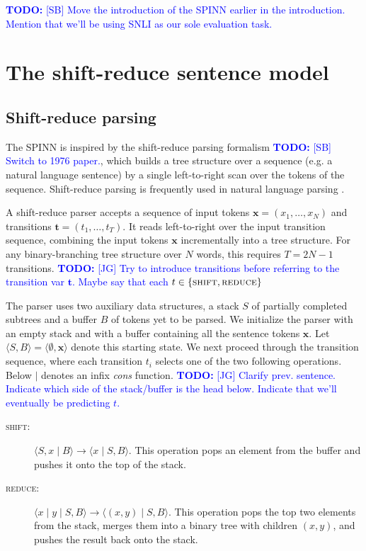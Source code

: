 \documentclass[11pt]{article}
\newcommand\todo[1]{\textcolor{blue}{\textbf{TODO:} #1}}
\newcommand{\shift}{\textsc{shift}}
\newcommand{\reduce}{\textsc{reduce}}
\begin{document}
\todo{[SB] Move the introduction of the SPINN earlier in the introduction. Mention that we'll be using SNLI as our sole evaluation task.}

\section{The shift-reduce sentence model}

\subsection{Shift-reduce parsing}

The SPINN is inspired by the shift-reduce parsing formalism \citep{aho1986compilers} \todo{[SB] Switch to 1976 paper.}, which builds a tree structure over a sequence (e.g. a natural language sentence) by a single left-to-right scan over the tokens of the sequence. Shift-reduce parsing is frequently used in natural language parsing \citep[e.g.][]{nivre2003efficient}.

A shift-reduce parser accepts a sequence of input tokens $\mathbf x = (x_1, \dots, x_N)$ and transitions $\mathbf t = (t_1, \dots, t_T)$. It reads left-to-right over the input transition sequence, combining the input tokens $\mathbf x$ incrementally into a tree structure. For any binary-branching tree structure over $N$ words, this requires $T = 2N - 1$ transitions. \todo{[JG] Try to introduce transitions before referring to the transition var $\mathbf t$. Maybe say that each $t\in\{\shift, \reduce\}$ }

The parser uses two auxiliary data structures, a stack $S$ of partially completed subtrees and a buffer $B$ of tokens yet to be parsed. We initialize the parser with an empty stack and with a buffer containing all the sentence tokens $\mathbf x$. Let $\langle S, B \rangle = \langle \emptyset, \mathbf x \rangle$ denote this starting state. We next proceed through the transition sequence, where each transition $t_i$ selects one of the two following operations. Below $\mid$ denotes an infix \textit{cons} function. \todo{[JG] Clarify prev. sentence. Indicate which side of the stack/buffer is the head below. Indicate that we'll eventually be predicting $t$.}
\begin{description}
  \item[\shift:] $\langle S, x \mid B \rangle \to \langle x \mid S, B \rangle$. This operation pops an element from the buffer and pushes it onto the top of the stack.
  \item[\reduce:] $\langle x \mid y \mid S, B \rangle \to \langle (x, y) \mid S, B \rangle$. This operation pops the top two elements from the stack, merges them into a binary tree with children $(x, y)$, and pushes the result back onto the stack.
\end{description}
\end{document}

